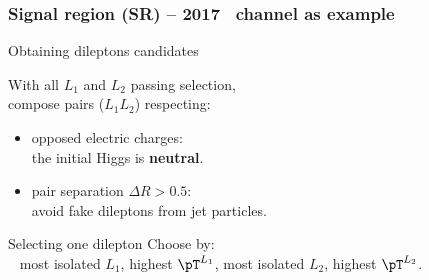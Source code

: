%

\begin{frame}
\frametitle{Signal region (SR) -- 2017 \mu\tauh\ channel as example}

\begin{block}{Obtaining dileptons candidates}
\begin{minipage}[c]{.55\linewidth}
With all $L_1$ and $L_2$ passing selection,\\
compose  pairs ($L_1L_2$) respecting:
\begin{itemize}
\item opposed electric charges:\\ the initial Higgs is \textbf{neutral}.
\item pair separation $\Delta R > \num{0.5}$:\\ avoid fake dileptons from jet particles.
\end{itemize}
\end{minipage}
\begin{minipage}[c]{.4\linewidth}
\vspace{\baselineskip}

\vspace{\baselineskip}
\end{minipage}
\end{block}
\pause
\begin{block}{Selecting one dilepton}
Choose by:\\
~\hfill
most isolated $L_1$,
\hfill
highest $\pT^{L_1}$,
\hfill
most isolated $L_2$,
\hfill
highest $\pT^{L_2}$.
\hfill~
\end{block}

\end{frame}


